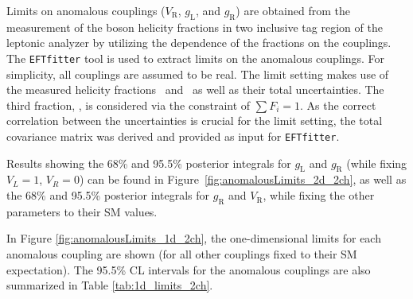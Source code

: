 Limits on anomalous couplings ($V_{\text{R}}$, $g_{\text{L}}$, and $g_{\text{R}}$) are obtained from the measurement of the \w boson helicity fractions in two inclusive \bt tag region of the leptonic analyzer by utilizing the dependence of the fractions on the couplings. The \texttt{EFTfitter} tool \cite{eftfitter} is used to extract limits on the anomalous couplings. For simplicity, all couplings are assumed to be real. The limit setting makes use of the measured helicity fractions \fo\ and \fl\ as well as their total uncertainties. The third fraction, \fr, is considered via the constraint of $\sum F_i = 1$. As the correct correlation between the uncertainties is crucial for the limit setting, the total covariance matrix was derived and provided as input for \texttt{EFTfitter}. 

Results showing the 68\% and 95.5\% posterior integrals for $g_{\text{L}}$ and $g_{\text{R}}$ (while fixing $V_L = 1$, $V_R = 0$) can be found in Figure~\ref{fig:anomalousLimits_2d_2ch}, as well as the 68\% and 95.5\% posterior integrals for $g_{\text{R}}$ and $V_{\text{R}}$, while fixing the other parameters to their SM values. %

In Figure \ref{fig:anomalousLimits_1d_2ch}, the one-dimensional limits for each anomalous coupling are shown (for all other couplings fixed to their SM expectation). %
The  95.5\% CL intervals for the anomalous couplings are also summarized in Table \ref{tab:1d_limits_2ch}. %


